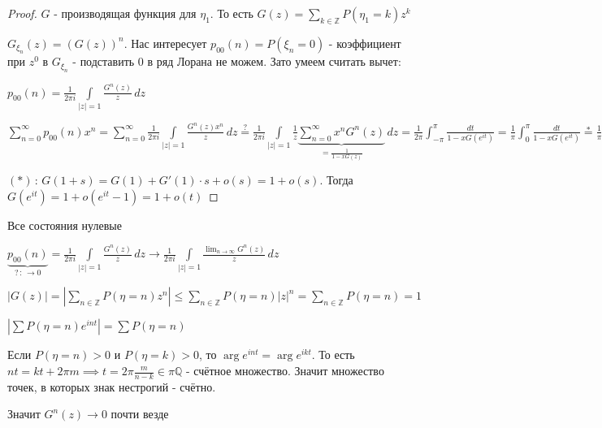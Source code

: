 \begin{proof}
    $G$ - производящая функция для $\eta_1$. То есть $G(z) = \sum\limits_{k \in \mathbb{Z}} P(\eta_1 = k) z^k$

    $G_{\xi_n} (z) = (G(z))^n$. Нас интересует $p_{00} (n) = P(\xi_n = 0)$ - коэффициент при $z^0$ в $G_{\xi_n}$ - подставить 0 в ряд Лорана не можем. Зато умеем считать вычет:

    $p_{00} (n) = \frac{1}{2\pi i} \int\limits_{|z| = 1} \frac{G^n (z)}{z} \, dz$

    $\sum\limits_{n=0}^\infty p_{00} (n)x^n = \sum\limits_{n = 0}^\infty \frac{1}{2\pi i} \int\limits_{|z| = 1} \frac{G^n (z) x^n}{z} \, dz \overset{?}{=} \frac{1}{2\pi i} \int\limits_{|z| = 1} \frac{1}{z} \underbrace{\sum\limits_{n = 0}^\infty x^n G^n (z)}_{= \frac{1}{1 - xG(z)}} \, dz = 
    \frac{1}{2\pi} \int_{-\pi}^\pi \frac{dt}{1 - xG(e^{it})} = \frac{1}{\pi} \int_0^\pi \frac{dt}{1 - xG(e^{it})} \overset{{*}}{=} \frac{1}{\pi} \int_0^\pi \frac{dt}{1 - x + o(xt)} \geqslant \frac{1}{\pi} \int_0^\pi \frac{dt}{1 - x + xt} = \frac{1}{\pi} \frac{\ln (1 - x + xt)}{x} \bigg |_{t=0}^{t = \pi} \rightarrow +\infty$

    $(*) \, : \, G(1 + s) = G(1) + G' (1) \cdot s + o(s) = 1 + o(s)$. Тогда $G(e^{it}) = 1 + o(e^{it} - 1) = 1 + o(t)$
\end{proof}

\begin{remark}
    Все состояния нулевые

    $\underbrace{p_{00} (n)}_{? \, : \, \rightarrow 0} = \frac{1}{2\pi i} \int\limits_{|z| = 1} \frac{G^n (z)}{z} \, dz \rightarrow \frac{1}{2\pi i} \int\limits_{|z| = 1} \frac{\lim_{n\to \infty} G^n (z)}{z} \, dz$

    $\left| G(z) \right| = \left| \sum\limits_{n \in \mathbb{Z}} P(\eta = n) z^n \right| \leqslant \sum\limits_{n \in \mathbb{Z}} P(\eta = n) |z|^n = \sum\limits_{n \in \mathbb{Z}} P(\eta = n) = 1$

    $\left| \sum P(\eta = n) e^{int} \right| = \sum P(\eta = n)$

    Если $P(\eta = n) > 0$ и $P(\eta = k) > 0$, то $\arg e^{int} = \arg e^{ikt}$. То есть $nt = kt + 2\pi m \implies t = 2\pi \frac{m}{n - k} \in \pi \mathbb{Q}$ - счётное множество. Значит множество точек, в которых знак нестрогий - счётно.

    Значит $G^n (z) \rightarrow 0$ почти везде
\end{remark}
